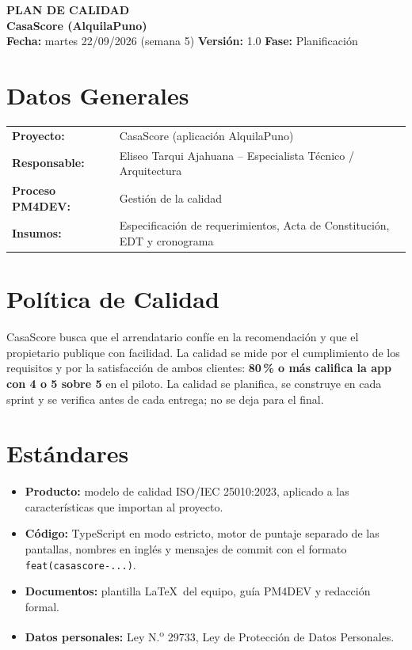 \documentclass[11pt,a4paper]{article}
\begin{document}
\begin{center}
    {\Large \textbf{\textcolor{AzulUNA}{PLAN DE CALIDAD}}}\\[3pt]
    {\normalsize \textbf{CasaScore (AlquilaPuno)}}\\[4pt]
    \footnotesize \textbf{Fecha:} martes 22/09/2026 (semana 5) \quad \textbar\quad \textbf{Versión:} 1.0 \quad \textbar\quad \textbf{Fase:} Planificación
\end{center}

\vspace{0.1cm}

\section{Datos Generales}
\noindent\begin{tabularx}{\textwidth}{@{}P{4.2cm} L@{}}
\toprule
\textbf{Proyecto:} & CasaScore (aplicación AlquilaPuno) \\
\textbf{Responsable:} & Eliseo Tarqui Ajahuana -- Especialista Técnico / Arquitectura \\
\textbf{Proceso PM4DEV:} & Gestión de la calidad \\
\textbf{Insumos:} & Especificación de requerimientos, Acta de Constitución, EDT y cronograma \\
\bottomrule
\end{tabularx}

\section{Política de Calidad}
CasaScore busca que el arrendatario confíe en la recomendación y que el propietario publique con facilidad. La calidad se mide por el cumplimiento de los requisitos y por la satisfacción de ambos clientes: \textbf{80\,\% o más califica la app con 4 o 5 sobre 5} en el piloto. La calidad se planifica, se construye en cada sprint y se verifica antes de cada entrega; no se deja para el final.

\section{Estándares}
\begin{itemize}[leftmargin=*]
    \item \textbf{Producto:} modelo de calidad ISO/IEC 25010:2023, aplicado a las características que importan al proyecto.
    \item \textbf{Código:} TypeScript en modo estricto, motor de puntaje separado de las pantallas, nombres en inglés y mensajes de commit con el formato \texttt{feat(casascore-...)}.
    \item \textbf{Documentos:} plantilla \LaTeX\ del equipo, guía PM4DEV y redacción formal.
    \item \textbf{Datos personales:} Ley N.\textsuperscript{o} 29733, Ley de Protección de Datos Personales.
\end{itemize}
\end{document}
